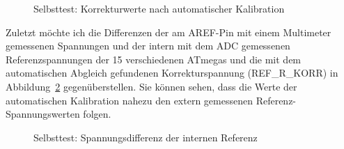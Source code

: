 \begin{figure}[H]
  \centering
  \resizebox{9cm}{!}{}
  \caption{Selbsttest: Korrekturwerte nach automatischer Kalibration}
  \label{fig:SelfTrefKorr}
\end{figure}

Zuletzt m\"ochte ich die Differenzen der am AREF-Pin mit einem Multimeter
gemessenen Spannungen und der intern mit dem ADC gemessenen Referenzspannungen der
15 verschiedenen ATmegas und die mit dem automatischen Abgleich
gefundenen Korrekturspannung (REF\_R\_KORR) in Abbildung~\ref{fig:SelfTrefDiff} gegen\"uberstellen.
Sie k\"onnen sehen, dass die Werte der automatischen Kalibration nahezu den extern
gemessenen Referenz-Spannungswerten folgen.

\begin{figure}[H]
  \centering
  \resizebox{9cm}{!}{}
  \caption{Selbsttest: Spannungsdifferenz der internen Referenz}
  \label{fig:SelfTrefDiff}
\end{figure}

